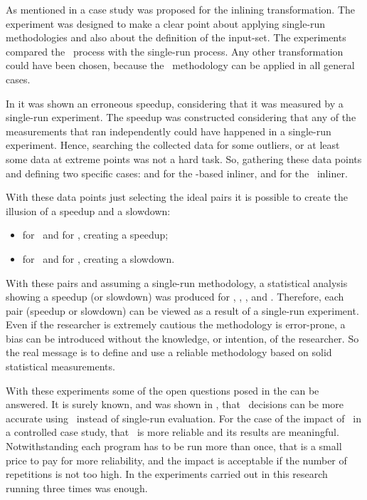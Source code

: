 
As mentioned in  a case study was proposed for the inlining transformation. The experiment was designed to make a clear point about applying single-run methodologies and also about the definition of the input-set. The experiments compared the \CP\ process with the single-run process. Any other transformation could have been chosen, because the \CP\ methodology can be applied in all general cases.

In  it was shown an erroneous speedup, considering that it was measured by a single-run experiment. The speedup was constructed considering that any of the measurements that ran independently could have happened in a single-run experiment. Hence, searching the collected data for some outliers, or at least some data at extreme points was not a hard task. So, gathering these data points and defining two specific cases:  and  for the \FDO-based inliner, and for the \llvm\ inliner.

With these data points just selecting the ideal pairs it is possible to create the illusion of a speedup and a slowdown:
\begin{itemize}
 \item {} for \FDO\ and  for \llvm, creating a speedup;
 \item {} for \FDO\ and  for \llvm, creating a slowdown.
\end{itemize}

With these pairs and assuming a single-run methodology, a statistical analysis showing a speedup (or slowdown) was produced for \bzip, \gzip, \gobmk, and \gcc. Therefore, each pair (speedup or slowdown) can be viewed as a result of a single-run experiment. Even if the researcher is extremely cautious the methodology is error-prone, a bias can be introduced without the knowledge, or intention, of the researcher. So the real message is to define and use a reliable methodology based on solid statistical measurements.

With these experiments some of the open questions posed in the  can be answered. It is surely known, and was shown in , that \FDI\ decisions can be more accurate using \CP\ instead of single-run evaluation. For the case of the impact of \CP\ in a controlled case study, that \CP\ is more reliable and its results are meaningful. Notwithstanding each program has to be run more than once, that is a small price to pay for more reliability, and the impact is acceptable if the number of repetitions is not too high. In the experiments carried out in this research running three times was enough.

